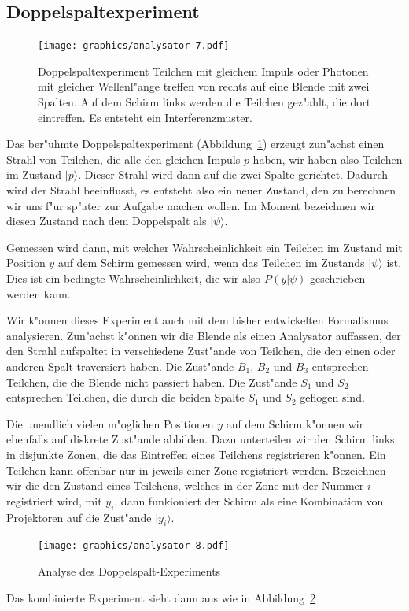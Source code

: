 \subsection{Doppelspaltexperiment}
\begin{figure}
\centering
\texttt{[image: graphics/analysator-7.pdf]}
\caption{Doppelspaltexperiment Teilchen mit gleichem Impuls oder Photonen
mit gleicher Wellenl"ange treffen von rechts auf eine Blende mit zwei
Spalten. Auf dem Schirm links werden die Teilchen gez"ahlt, die dort
eintreffen. Es entsteht ein Interferenzmuster.
\label{doppelspalt-bild}}
\end{figure}
Das ber"uhmte Doppelspaltexperiment (Abbildung~\ref{doppelspalt-bild})
erzeugt zun"achst einen Strahl
von Teilchen, die alle den gleichen Impuls $p$ haben, wir haben also
Teilchen im Zustand $|p\rangle$. Dieser Strahl
wird dann auf die zwei Spalte gerichtet. Dadurch wird der Strahl
beeinflusst, es entsteht also ein neuer Zustand, den zu berechnen
wir uns f"ur sp"ater zur Aufgabe machen wollen.
Im Moment bezeichnen wir diesen Zustand nach dem Doppelspalt 
als $|\psi\rangle$.

Gemessen wird dann, mit welcher Wahrscheinlichkeit
ein Teilchen im Zustand mit Position $y$ auf dem Schirm
gemessen wird, wenn das Teilchen im Zustands $|\psi\rangle$
ist. Dies ist ein bedingte Wahrscheinlichkeit, die wir also
$P(y|\psi)$ geschrieben werden kann.

Wir k"onnen dieses Experiment auch mit dem bisher entwickelten
Formalismus analysieren.
Zun"achst k"onnen wir die Blende als einen Analysator auffassen, der
den Strahl aufspaltet in verschiedene Zust"ande von Teilchen, die
den einen oder anderen Spalt traversiert haben.
Die Zust"ande $B_1$, $B_2$ und $B_3$ entsprechen Teilchen, die die
Blende nicht passiert haben. Die Zust"ande $S_1$ und $S_2$ entsprechen
Teilchen, die durch die beiden Spalte $S_1$ und $S_2$ geflogen sind.

Die unendlich vielen m"oglichen Positionen $y$ auf dem Schirm
k"onnen wir ebenfalls auf diskrete Zust"ande abbilden.
Dazu unterteilen wir den Schirm links in
disjunkte Zonen, die das Eintreffen eines Teilchens registrieren k"onnen.
Ein Teilchen kann offenbar nur in jeweils einer Zone registriert werden.
Bezeichnen wir die den Zustand eines Teilchens, welches in der Zone mit
der Nummer $i$ registriert wird, mit $y_i$, dann funkioniert der Schirm als
eine Kombination von Projektoren auf die Zust"ande $|y_i\rangle$.
\begin{figure}
\centering
\texttt{[image: graphics/analysator-8.pdf]}
\caption{Analyse des Doppelspalt-Experiments
\label{doppelspalt-analyse}}
\end{figure}
Das kombinierte Experiment sieht dann aus wie in
Abbildung~\ref{doppelspalt-analyse}

